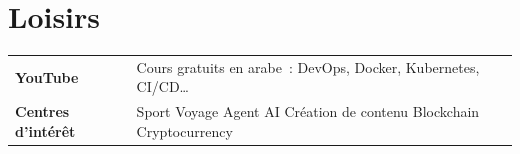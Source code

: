 \documentclass[a4paper,10pt]{article}
\begin{document}
\section{Loisirs}
\begin{tabularx}{\linewidth}{@{}p{3.8cm} X@{}}
  {\small\bfseries YouTube} &
  {\small Cours gratuits en arabe~: DevOps, Docker, Kubernetes, CI/CD\ldots} \\[2pt]
  {\small\bfseries Centres d'intérêt} &
  {\small Sport \textbar{} Voyage \textbar{} Agent AI \textbar{} Création de contenu} \textbar{} Blockchain  \textbar{} Cryptocurrency \\
\end{tabularx}
\end{document}
